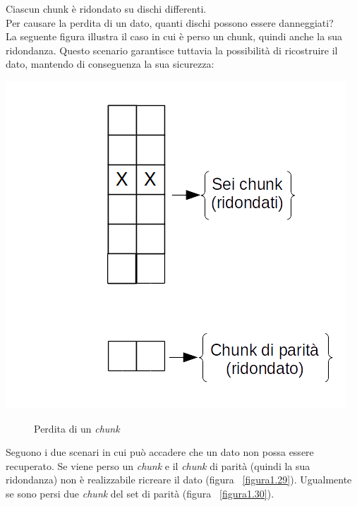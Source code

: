Ciascun chunk \`{e} ridondato su dischi differenti. \\
Per causare la perdita di un dato, quanti dischi possono essere danneggiati?\\

La seguente figura illustra il caso in cui \`{e} perso un chunk, quindi anche la sua ridondanza. Questo scenario garantisce tuttavia la possibilit\`{a} di ricostruire il dato, mantendo di conseguenza la sua sicurezza:

\begin{center}
\includegraphics[scale=0.55]{img/chunk1.png}
\end{center}
\begin{figure}[htbp]
\caption{Perdita di un \textit{chunk} \label{figura1.17}}
\end{figure}

Seguono i due scenari in cui pu\`{o} accadere che un dato non possa essere recuperato.
Se viene perso un \textit{chunk} e il \textit{chunk} di parit\`{a} (quindi la sua ridondanza) non \`{e} realizzabile ricreare il dato (figura ~\ref{figura1.29}). Ugualmente se sono persi due \textit{chunk} del set di parit\`{a} (figura ~\ref{figura1.30}).

